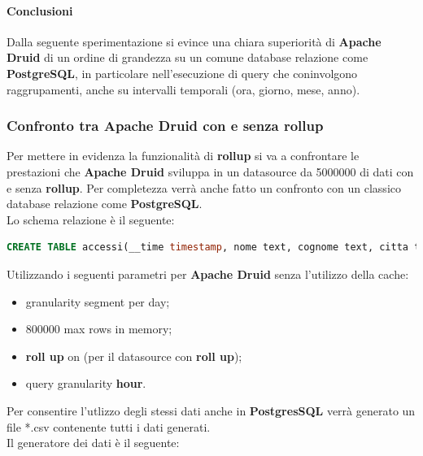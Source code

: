 \documentclass{article}
\begin{document}
\paragraph{Conclusioni}
Dalla seguente sperimentazione si evince una chiara superiorità di \textbf{Apache Druid} di un ordine di grandezza su un comune database relazione come \textbf{PostgreSQL}, in particolare nell'esecuzione di query che coninvolgono raggrupamenti, anche su intervalli temporali (ora, giorno, mese, anno).
\subsubsection{Confronto tra Apache Druid con e senza rollup}
Per mettere in evidenza la funzionalità di \textbf{rollup} si va a confrontare le prestazioni che \textbf{Apache Druid} sviluppa in un datasource da 5000000 di dati con e senza \textbf{rollup}. Per completezza verrà anche fatto un confronto con un classico database relazione come \textbf{PostgreSQL}.\\
Lo schema relazione è il seguente:
\begin{lstlisting}[language=SQL]
CREATE TABLE accessi(__time timestamp, nome text, cognome text, citta text, stato text, datan date, istruzione text, hobby text); 
\end{lstlisting}
Utilizzando i seguenti parametri per \textbf{Apache Druid} senza l'utilizzo della cache: 
\begin{itemize}
    \item granularity segment per day;
    \item 800000 max rows in memory;
    \item \textbf{roll up} on (per il datasource con \textbf{roll up});
    \item query granularity \textbf{hour}.
\end{itemize}
Per consentire l'utlizzo degli stessi dati anche in \textbf{PostgresSQL} verrà generato un file *.csv contenente tutti i dati generati.\\
Il generatore dei dati è il seguente: 
\end{document}

